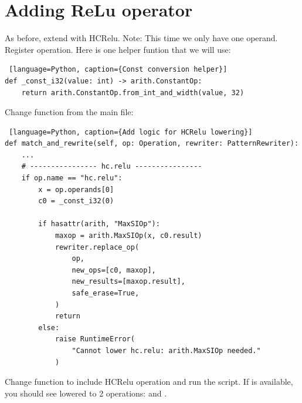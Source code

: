 \documentclass[../main.tex]{subfiles}
\begin{document}
\section{Adding ReLu operator}
As before, extend  with HCRelu.
Note: This time we only have one operand. 
Register operation.
Here is one helper funtion that we will use:
\begin{lstlisting} [language=Python, caption={Const conversion helper}]
def _const_i32(value: int) -> arith.ConstantOp:
    return arith.ConstantOp.from_int_and_width(value, 32)
\end{lstlisting}

Change  function from the main file:
\begin{lstlisting} [language=Python, caption={Add logic for HCRelu lowering}]
def match_and_rewrite(self, op: Operation, rewriter: PatternRewriter):
    ...
    # ---------------- hc.relu ----------------
    if op.name == "hc.relu":
        x = op.operands[0]
        c0 = _const_i32(0)

        if hasattr(arith, "MaxSIOp"):
            maxop = arith.MaxSIOp(x, c0.result)
            rewriter.replace_op(
                op,
                new_ops=[c0, maxop],
                new_results=[maxop.result],
                safe_erase=True,
            )
            return
        else:
            raise RuntimeError(
                "Cannot lower hc.relu: arith.MaxSIOp needed."
            )

\end{lstlisting}
Change  function to include HCRelu operation and run the script.
If  is available, you should see 
lowered to 2 operations:  and .
\end{document}
